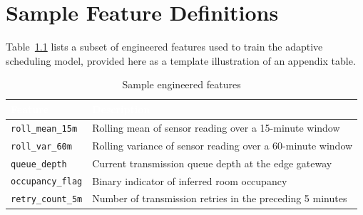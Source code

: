 \chapter{Sample Feature Definitions}
\label{app:features}

Table~\ref{tab:features} lists a subset of engineered features used to train the adaptive
scheduling model, provided here as a template illustration of an appendix table.

\begin{table}[htbp]
\centering
\caption{Sample engineered features}
\label{tab:features}
\begin{tabularx}{\textwidth}{@{}p{3.4cm}X@{}}
\toprule
\rowcolor{umslate}
\textcolor{white}{\textbf{Feature}} & \textcolor{white}{\textbf{Description}} \\
\midrule
\texttt{roll\_mean\_15m} & Rolling mean of sensor reading over a 15-minute window \\
\addlinespace
\texttt{roll\_var\_60m} & Rolling variance of sensor reading over a 60-minute window \\
\addlinespace
\texttt{queue\_depth} & Current transmission queue depth at the edge gateway \\
\addlinespace
\texttt{occupancy\_flag} & Binary indicator of inferred room occupancy \\
\addlinespace
\texttt{retry\_count\_5m} & Number of transmission retries in the preceding 5 minutes \\
\bottomrule
\end{tabularx}
\end{table}
